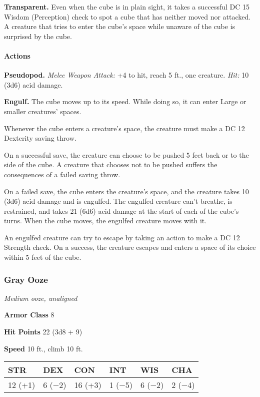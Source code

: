 \documentclass[
]{article}
\begin{document}
\textbf{Transparent.} Even when the cube is in plain sight, it takes a
successful DC 15 Wisdom (Perception) check to spot a cube that has
neither moved nor attacked. A creature that tries to enter the cube's
space while unaware of the cube is surprised by the cube.

\hypertarget{actions-3}{%
\paragraph{Actions}\label{actions-3}}

\textbf{Pseudopod.} \emph{Melee Weapon Attack:} +4 to hit, reach 5 ft.,
one creature. \emph{Hit:} 10 (3d6) acid damage.

\textbf{Engulf.} The cube moves up to its speed. While doing so, it can
enter Large or smaller creatures' spaces.

Whenever the cube enters a creature's space, the creature must make a DC
12 Dexterity saving throw.

On a successful save, the creature can choose to be pushed 5 feet back
or to the side of the cube. A creature that chooses not to be pushed
suffers the consequences of a failed saving throw.

On a failed save, the cube enters the creature's space, and the creature
takes 10 (3d6) acid damage and is engulfed. The engulfed creature can't
breathe, is restrained, and takes 21 (6d6) acid damage at the start of
each of the cube's turns. When the cube moves, the engulfed creature
moves with it.

An engulfed creature can try to escape by taking an action to make a DC
12 Strength check. On a success, the creature escapes and enters a space
of its choice within 5 feet of the cube.

\hypertarget{gray-ooze}{%
\subsubsection{Gray Ooze}\label{gray-ooze}}

\emph{Medium ooze, unaligned}

\textbf{Armor Class} 8

\textbf{Hit Points} 22 (3d8 + 9)

\textbf{Speed} 10 ft., climb 10 ft.

\begin{longtable}[]{@{}llllll@{}}
\toprule
STR & DEX & CON & INT & WIS & CHA\tabularnewline
\midrule
\endhead
12 (+1) & 6 (−2) & 16 (+3) & 1 (−5) & 6 (−2) & 2 (−4)\tabularnewline
\bottomrule
\end{longtable}
\end{document}
